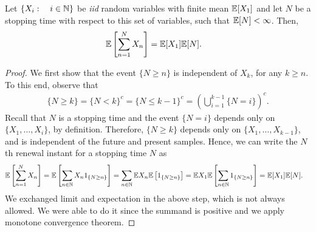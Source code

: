\documentclass[a4paper,10pt, english]{article}
\begin{document}
\begin{lem}
Let $\{X_i:\quad i\in \mathbb{N}\}$ be \textit{iid} random variables with finite mean $\mathbb{E}[X_1]$ and let $N$ be a stopping time with respect to this set of variables, such that $\mathbb{E}[N] < \infty$. 
Then,
\begin{align*}
\mathbb{E}\left[\sum_{n=1}^N X_n\right] &= \mathbb{E}[X_1]\mathbb{E}[N].
\end{align*}
\end{lem}
\begin{proof} 
We first show that the event $\{N \geq n\}$ is independent of $X_k$, for any $k \geq n$. 
To this end, observe that 
\begin{align*}
\{N \geq k\} = \{N < k\}^c = \{N \leq k-1\}^c = \left(\bigcup_{i=1}^{k-1} \{N = i\}\right)^c. 
\end{align*}
Recall that $N$ is a stopping time and the event $\{N=i\}$ depends only on $\{X_1,\ldots, X_i\}$, by definition.  
Therefore, $\{N \geq k\}$ depends only on $\{X_1,\ldots, X_{k-1}\}$, and is independent of the future and present samples. 
Hence, we can write the $N$th renewal instant for a stopping time $N$ as 
\begin{align*}
\mathbb{E}\left[\sum_{n=1}^N X_n\right] &= \mathbb{E}\left[\sum_{n \in \mathbb{N}} X_n 1_{\{N \geq n\}}\right] = \sum_{n \in \mathbb{N}} \mathbb{E} X_n \mathbb{E}\left[1_{\{N \geq n\}}\right] = \mathbb{E} X_1\mathbb{E}\left[ \sum_{n \in \mathbb{N}} 1_{\{N \geq n\}}\right] = \mathbb{E}[X_1]\mathbb{E}[N].
\end{align*}
We exchanged limit and expectation in the above step, which is not always allowed. 
We were able to do it since the summand is positive and we apply monotone convergence theorem. 
\end{proof}
\end{document}
